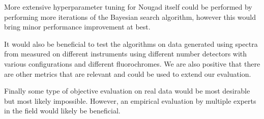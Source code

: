 More extensive hyperparameter tuning for Nougad itself could be performed by performing more iterations of the Bayesian search algorithm, however this would bring minor performance improvement at best. 

It would also be beneficial to test the algorithms on data generated using spectra from measured on different instruments using different number detectors with various configurations and different fluorochromes. We are also positive that there are other metrics that are relevant and could be used to extend our evaluation. 

Finally some type of objective evaluation on real data would be most desirable but most likely impossible. However, an empirical evaluation by multiple experts in the field would likely be beneficial. 
